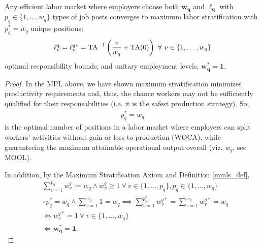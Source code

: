 \documentclass[hidelinks, nonatbib]{elsarticle}
\begin{document}
\begin{lemma}
    Any efficient labor market where employers choose both $\boldsymbol{w_q}$ and $\boldsymbol{\ell_q}$ with $p_q \in \{1, \dots, w_q\}$ types of job posts converges to maximum labor stratification with
    $
    p_{q}^{*} = w_q
    $
    unique positions;
    \begin{gather}
    \ell_{v}^{q}
    =
    \ell_{v}^{q*}
    =
    \text{TA}^{-1}\left(
        \frac{v}{w_q}
        +
        \text{TA}(0)
    \right)
    \
    \forall
    \
    v \in 
    \left\{
        1, \dots, w_q
    \right\}
    \end{gather}
    optimal responsibility bounds; and unitary employment levels,
    $
    \boldsymbol{w_{q}^{*}} =
    \boldsymbol{1}
    .
    $
    
    \begin{proof}
        In the MPL above, we have shown maximum stratification minimizes productivity requirements and, thus, the chance workers may not be sufficiently qualified for their responsabilities (i.e. it is the safest production strategy). So, 
        \begin{gather}
            p_{q}^{*} = w_q
        \end{gather}
        is the optimal number of positions in a labor market where employers can split workers' activities without gain or loss to production (WOCA), while guaranteeing the maximum attainable operational output overall (viz. $w_q$, see MOOL).
        
        In addition, by the Maximum Stratification Axiom and Definition \ref{mmls_def},
        \begin{align}
            &
            \sum_{v=1}^{p_q}{
                w_{v}^{q}
            }
            := 
            w_q
            \land
            w_{v}^{q} 
            \geq 
            1
            \
            \forall
            \
            v \in \{1, \dots, p_q\},
            p_q \in \{1, \dots, w_q\}
            \\
            &
            \therefore
            p_{q}^{*} = w_q
            \land
            \sum_{v=1}^{w_q}
            1
            =
            w_q
            \implies
            \sum_{v=1}^{p_{q}^{*}}{
                w_{v}^{q*}
            }
            =
            \sum_{v=1}^{w_q}{
                w_{v}^{q*}
            }
            =
            w_q
            \\
            &
            \iff
            w_{v}^{q*}
            =
            1
            \
            \forall
            \
            v \in \{1, \dots, w_q\}
            \\
            &
            \iff
            \boldsymbol{w_{q}^{*}} =
            \boldsymbol{1}
            .
            \end{align}
            

\end{proof}
\end{lemma}
\end{document}
